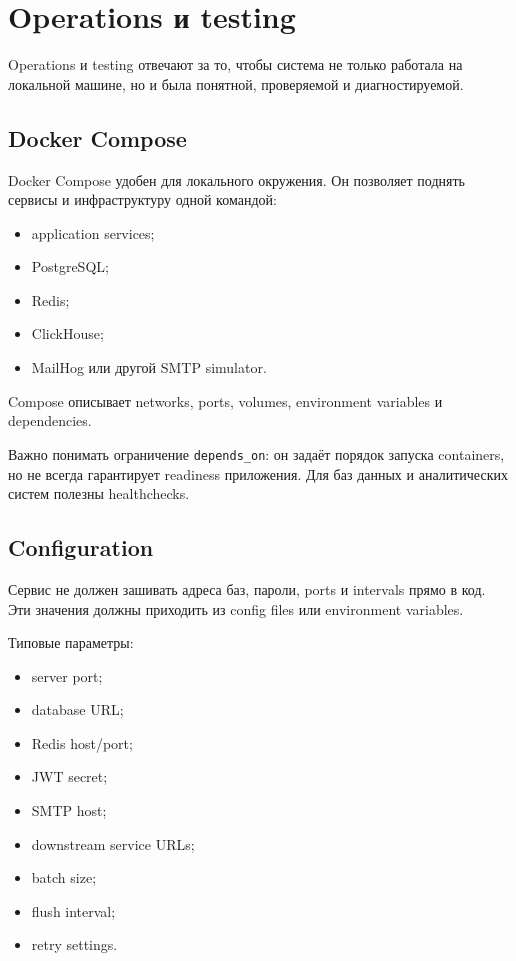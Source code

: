 \documentclass[12pt,a4paper]{article}
\begin{document}
\newpage
\section{Operations и testing}

Operations и testing отвечают за то, чтобы система не только работала на локальной
машине, но и была понятной, проверяемой и диагностируемой.

\subsection{Docker Compose}

Docker Compose удобен для локального окружения. Он позволяет поднять сервисы и
инфраструктуру одной командой:
\begin{itemize}
    \item application services;
    \item PostgreSQL;
    \item Redis;
    \item ClickHouse;
    \item MailHog или другой SMTP simulator.
\end{itemize}

Compose описывает networks, ports, volumes, environment variables и dependencies.

Важно понимать ограничение \texttt{depends\_on}: он задаёт порядок запуска
containers, но не всегда гарантирует readiness приложения. Для баз данных и
аналитических систем полезны healthchecks.

\subsection{Configuration}

Сервис не должен зашивать адреса баз, пароли, ports и intervals прямо в код. Эти
значения должны приходить из config files или environment variables.

Типовые параметры:
\begin{itemize}
    \item server port;
    \item database URL;
    \item Redis host/port;
    \item JWT secret;
    \item SMTP host;
    \item downstream service URLs;
    \item batch size;
    \item flush interval;
    \item retry settings.
\end{itemize}
\end{document}
